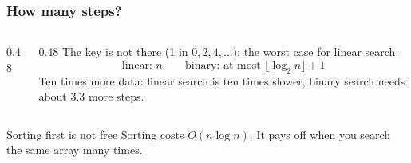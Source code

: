 \documentclass[aspectratio=169,10pt,compress]{beamer}
\begin{document}
\begin{frame}[t,fragile] \frametitle{How many steps?}
	\begin{columns}[T]
		\begin{column}{0.48\textwidth}
		\end{column}
		\begin{column}{0.48\textwidth}
			The key is not there (1 in $0, 2, 4, \dots$): the worst case for linear search.
			\[
				\text{linear: } n
				\qquad
				\text{binary: at most } \lfloor \log_{2} n \rfloor + 1
			\]
			Ten times more data: linear search is ten times slower,
			binary search needs about 3.3 more steps.
		\end{column}
	\end{columns}

	\vspace{0.5em}
	\begin{alertblock}{Sorting first is not free}
		\small Sorting costs $O(n \log n)$. It pays off when you search the same array many times.
	\end{alertblock}
\end{frame}




\end{document}
